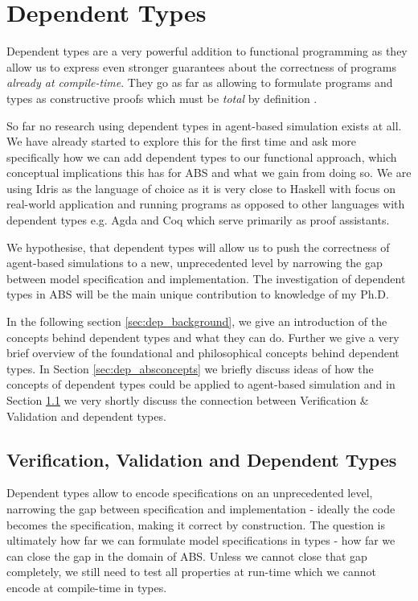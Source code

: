 \chapter{Dependent Types}
\label{chap:dependent_types}
Dependent types are a very powerful addition to functional programming as they allow us to express even stronger guarantees about the correctness of programs \textit{already at compile-time}. They go as far as allowing to formulate programs and types as constructive proofs which must be \textit{total} by definition \cite{thompson_type_1991, mckinna_why_2006, altenkirch_pi_2010}. 

So far no research using dependent types in agent-based simulation exists at all. We have already started to explore this for the first time and ask more specifically how we can add dependent types to our functional approach, which conceptual implications this has for ABS and what we gain from doing so. We are using Idris \cite{brady_idris_2013} as the language of choice as it is very close to Haskell with focus on real-world application and running programs as opposed to other languages with dependent types e.g. Agda and Coq which serve primarily as proof assistants.

We hypothesise, that  dependent types will allow us to push the correctness of agent-based simulations to a new, unprecedented level by narrowing the gap between model specification and implementation. The investigation of dependent types in ABS will be the main unique contribution to knowledge of my Ph.D.

In the following section \ref{sec:dep_background}, we give an introduction of the concepts behind dependent types and what they can do. Further we give a very brief overview of the foundational and philosophical concepts behind dependent types. In Section \ref{sec:dep_absconcepts} we briefly discuss ideas of how the concepts of dependent types could be applied to agent-based simulation and in Section \ref{sec:dep_vav_deptypes} we very shortly discuss the connection between Verification \& Validation and dependent types.





\section{Verification, Validation and Dependent Types}
\label{sec:dep_vav_deptypes}
Dependent types allow to encode specifications on an unprecedented level, narrowing the gap between specification and implementation - ideally the code becomes the specification, making it correct by construction. The question is ultimately how far we can formulate model specifications in types - how far we can close the gap in the domain of ABS. Unless we cannot close that gap completely, we still need to test all properties at run-time which we cannot encode at compile-time in types.


